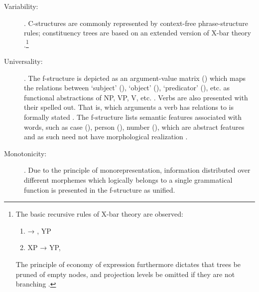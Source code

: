 \begin{description}
\item[Variability:] . 
C-structures are commonly represented by context-free phrase-structure rules; 
constituency trees are based on an extended version of X-bar theory 
\citep[42]{bresnan2016}.\footnote{The basic recursive rules of X-bar theory 
are observed:
\begin{enumerate}[nosep, leftmargin={2\footnotemargin}]
\item {} → , YP
\item XP → YP, 
\end{enumerate}

The principle of economy of expression furthermore dictates that trees be 
pruned of empty nodes, and projection levels be omitted if they are not 
branching \citep[119--128]{bresnan2016}.}

\item[Universality:] . The f-structure is depicted 
as an argument-value matrix (\Avm{}) which maps the relations between 
`subject' (\Sbj{}), `object' (\Obj{}), `predicator' (\Pred{}), etc. as 
functional abstractions of NP, VP, V, etc. \citep[42]{bresnan2016}. Verbs 
are also presented with their  spelled out. That is, which 
arguments a verb has relations to is formally stated \citep[15]{bresnan2016}. 
The f-structure lists semantic features associated with words, such as case 
(\Case{}), person (\Pers{}), number (\Num{}), which are abstract features and 
as such need not have morphological realization \citep[43]{bresnan2016}.

\item[Monotonicity:] . Due to the principle of monorepresentation, 
information distributed over different morphemes which logically 
belongs to a single grammatical function is presented in the f-structure as 
unified.

\end{description}

